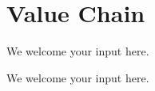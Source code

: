 \section{Value Chain}\label{sec:ekgmm-a-2-2}

We welcome your input here.

\ekgmmContextSection

We welcome your input here.

